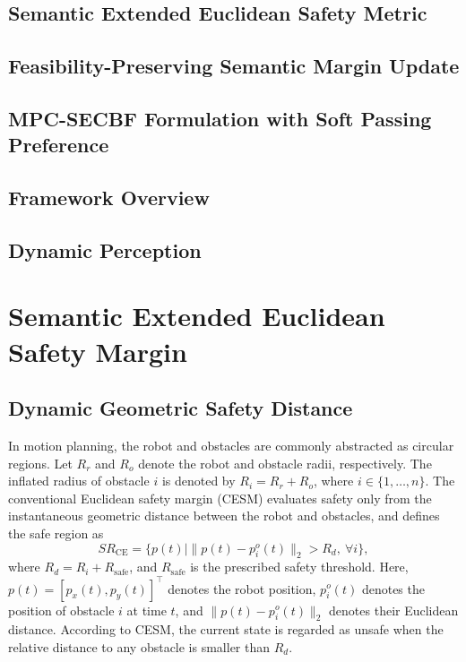 \documentclass[journal]{IEEEtranTIE}
\begin{document}
\subsection{Semantic Extended Euclidean Safety Metric}

\subsection{Feasibility-Preserving Semantic Margin Update}

\subsection{MPC-SECBF Formulation with Soft Passing Preference}
    

    \subsection{Framework Overview}
    \label{sec:Framework_Overview}

    \subsection{Dynamic Perception}
    \label{sec:M_Dynamic_Perception}


    \section{Semantic Extended Euclidean Safety Margin}

    \subsection{Dynamic Geometric Safety Distance}
    In motion planning, the robot and obstacles are commonly abstracted as
    circular regions. Let $R_r$ and $R_o$ denote the robot and obstacle radii,
    respectively. The inflated radius of obstacle $i$ is denoted by
    $R_i=R_r+R_o$, where $i\in\{1,\ldots,n\}$. The conventional Euclidean safety
    margin (CESM) evaluates safety only from the instantaneous geometric distance
    between the robot and obstacles, and defines the safe region as
    \begin{equation}
    SR_{\mathrm{CE}} =
    \{p(t)\mid \|p(t)-p_i^o(t)\|_2>R_d,\ \forall i\},
    \end{equation}
    where $R_d=R_i+R_{\mathrm{safe}}$, and $R_{\mathrm{safe}}$ is the prescribed
    safety threshold. Here, $p(t)=[p_x(t),p_y(t)]^\top$ denotes the robot
    position, $p_i^o(t)$ denotes the position of obstacle $i$ at time $t$, and
    $\|p(t)-p_i^o(t)\|_2$ denotes their Euclidean distance. According to CESM,
    the current state is regarded as unsafe when the relative distance to any
    obstacle is smaller than $R_d$.
\end{document}
